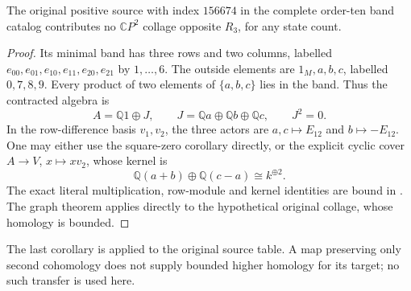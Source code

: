 \begin{corollary}
\label{CP2:A-ten-source156674-local-graph}
The original positive source with index $156674$ in the complete
order-ten band catalog contributes no $\mathbb CP^2$ collage opposite
$R_3$, for any state count.
\end{corollary}
\begin{proof}
Its minimal band has three rows and two columns, labelled
$e_{00},e_{01},e_{10},e_{11},e_{20},e_{21}$ by $1,\ldots,6$.
The outside elements are $1_M,a,b,c$, labelled $0,7,8,9$.
Every product of two elements of $\{a,b,c\}$ lies in the band.
Thus the contracted algebra is
\[
 A=\mathbb Q1\oplus J,\qquad
 J=\mathbb Qa\oplus\mathbb Qb\oplus\mathbb Qc,
 \qquad J^2=0.
\]
In the row-difference basis $v_1,v_2$, the three actors are
$a,c\mapsto E_{12}$ and $b\mapsto-E_{12}$.
One may either use the square-zero corollary directly, or the explicit
cyclic cover $A\to V$, $x\mapsto xv_2$, whose kernel is
\[
 \mathbb Q(a+b)\oplus\mathbb Q(c-a)\cong k^{\oplus2}.
\]
The exact literal multiplication, row-module and kernel identities
are bound in
.
The graph theorem applies directly to the hypothetical original
collage, whose homology is bounded.
\end{proof}

\begin{remark*}
The last corollary is applied to the original source table.  A map
preserving only second cohomology does not supply bounded higher
homology for its target; no such transfer is used here.
\end{remark*}
